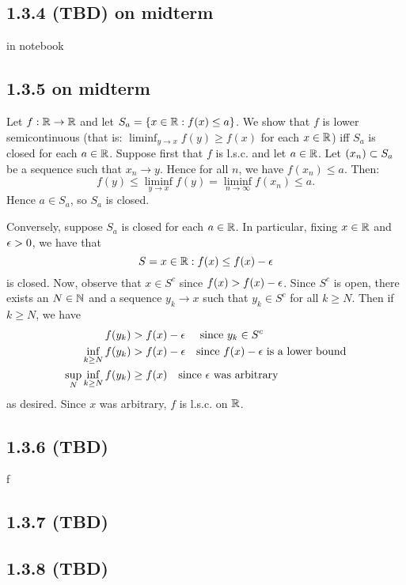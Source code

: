 \documentclass[11pt]{article}
\begin{document}
\subsection*{1.3.4 (TBD) on midterm}



in notebook


\subsection*{1.3.5 on midterm}

Let $f:{\mathbb R} \to {\mathbb R}$ and let $S_a = \{x \in {\mathbb R} : f(x) \leq a\}$. We show that $f$ is lower semicontinuous (that is: $\liminf_{y\to x}f(y) \geq f(x)$ for each $x \in {\mathbb R}$) iff $S_a$ is closed for each $a \in {\mathbb R}$. Suppose first that $f$ is l.s.c. and let $a \in {\mathbb R}$. Let $(x_n) \subset S_a$ be a sequence such that $x_n \to y$. Hence for all $n$, we have $f(x_n) \leq a$. Then: \[f(y) \leq \liminf_{y \to x} f(y) = \liminf_{n \to \infty} f(x_n) \leq a.\] Hence $a \in S_a$, so $S_a$ is closed. 

Conversely, suppose $S_a$ is closed for each $a \in {\mathbb R}$. In particular, fixing $x \in {\mathbb R}$ and $\epsilon > 0$, we have that \[S = x \in {\mathbb R} : f(x) \leq f(x) - \epsilon\] is closed. Now, observe that $x \in S^c$ since $f(x) > f(x) - \epsilon$. Since $S^c$ is open, there exists an $N \in {\mathbb N}$ and a sequence $y_k \to x$ such that $y_k \in S^c$ for all $k \geq N$. Then if $k \geq N$, we have \begin{align*}
    f(y_k) &> f(x) - \epsilon \quad \text{ since $y_k \in S^c$} \\
    \inf_{k \geq N} f(y_k) &> f(x) - \epsilon \quad \text{since $f(x)-\epsilon$ is a lower bound} \\
    \sup_{N} \inf_{k \geq N} f(y_k) &\geq f(x) \quad \text{since $\epsilon$ was arbitrary}
\end{align*} as desired. Since $x$ was arbitrary, $f$ is l.s.c. on ${\mathbb R}$.

\subsection*{1.3.6 (TBD)}


f

\subsection*{1.3.7 (TBD)}

\subsection*{1.3.8 (TBD)} 
\end{document}
